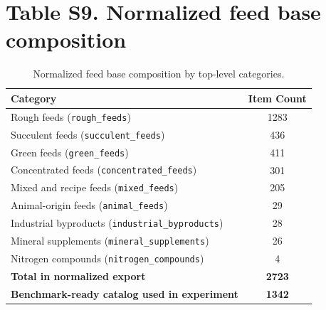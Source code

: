 \documentclass[11pt]{article}
\begin{document}
\section*{Table S9. Normalized feed base composition}
\begin{table}[H]
\centering
\caption{Normalized feed base composition by top-level categories.}\label{tab:s9_db}
\begin{tabular}{lc}
\toprule
\textbf{Category} & \textbf{Item Count} \\
\midrule
Rough feeds (\texttt{rough\_feeds}) & 1283 \\
Succulent feeds (\texttt{succulent\_feeds}) & 436 \\
Green feeds (\texttt{green\_feeds}) & 411 \\
Concentrated feeds (\texttt{concentrated\_feeds}) & 301 \\
Mixed and recipe feeds (\texttt{mixed\_feeds}) & 205 \\
Animal-origin feeds (\texttt{animal\_feeds}) & 29 \\
Industrial byproducts (\texttt{industrial\_byproducts}) & 28 \\
Mineral supplements (\texttt{mineral\_supplements}) & 26 \\
Nitrogen compounds (\texttt{nitrogen\_compounds}) & 4 \\
\midrule
\textbf{Total in normalized export} & \textbf{2723} \\
\textbf{Benchmark-ready catalog used in experiment} & \textbf{1342} \\
\bottomrule
\end{tabular}
\end{table}
\end{document}
